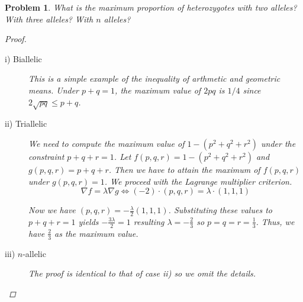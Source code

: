 \documentclass[12pt]{report}
\newtheorem{problem}{Problem}[chapter]
\begin{document}
        \begin{problem}
            What is the maximum proportion of heterozygotes with two alleles? With three alleles? With $n$ alleles?
            \begin{proof}
                
                \begin{description}
                    \item[i) Biallelic]
                This is a simple example of the inequality of arthmetic and geometric means.
                Under $p+q=1$, the maximum value of $2pq$ is $1/4$ since $2 \sqrt{pq} \leq p+q$.

                    \item[ii) Triallelic]
                We need to compute the maximum value of $1-(p^2+q^2+r^2)$ under the constraint $p+q+r=1$. 
                Let $f(p,q,r) = 1-(p^2+q^2+r^2)$ and $g(p,q,r)=p+q+r$.
                Then we have to attain the maximum of $f(p,q,r)$ under $g(p,q,r)=1$.
                We proceed with the Lagrange multiplier criterion. 
                \begin{equation*}
                    \nabla{f} = \lambda \nabla{g} \Leftrightarrow
                    (-2) \cdot (p,q,r) = \lambda \cdot (1,1,1)
                \end{equation*}

                Now we have $(p,q,r) = -\frac{\lambda}{2}(1,1,1)$.
                Substituting these values to $p+q+r=1$ yields $-\frac{3\lambda}{2} = 1 $ resulting $\lambda = -\frac{2}{3}$ so $p=q=r=\frac{1}{3}$.
                Thus, we have $\frac{2}{3}$ as the maximum value.

                    \item[iii) $n$-allelic]
                        The proof is identical to that of case ii) so we omit the details.
                \end{description}
            \end{proof}

        \end{problem}
\end{document}
